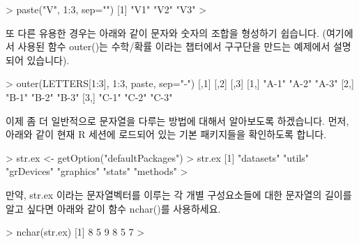 \begin{Schunk}
\begin{Soutput}
> paste("V", 1:3, sep="")
[1] "V1" "V2" "V3"
> 
\end{Soutput}
\end{Schunk}

또 다른 유용한 경우는 아래와 같이 문자와 숫자의 조합을 형성하기 쉽습니다. 
(여기에서 사용된 함수 outer()는 수학/확률 이라는 챕터에서 구구단을 만드는 예제에서 설명되어 있습니다).

\begin{Schunk}
\begin{Soutput}
> outer(LETTERS[1:3], 1:3, paste, sep="-")
     [,1]  [,2]  [,3] 
[1,] "A-1" "A-2" "A-3"
[2,] "B-1" "B-2" "B-3"
[3,] "C-1" "C-2" "C-3"
\end{Soutput}
\end{Schunk}

\begin{comment}
\begin{Schunk}
\begin{Soutput}
> lower.tri(outer(LETTERS[1:3], 1:3, paste, sep="-"))
      [,1]  [,2]  [,3]
[1,] FALSE FALSE FALSE
[2,]  TRUE FALSE FALSE
[3,]  TRUE  TRUE FALSE

> upper.tri(outer(LETTERS[1:3], 1:3, paste, sep="-"))
      [,1]  [,2]  [,3]
[1,] FALSE  TRUE  TRUE
[2,] FALSE FALSE  TRUE
[3,] FALSE FALSE FALSE
> 
\end{Soutput}
\end{Schunk}	
\end{comment}

이제 좀 더 일반적으로 문자열을 다루는 방법에 대해서 알아보도록 하겠습니다.
먼저, 아래와 같이 현재 R 세션에 로드되어 있는 기본 패키지들을 확인하도록 합니다.

\begin{Schunk}
\begin{Soutput}
> str.ex <- getOption("defaultPackages")
> str.ex
[1] "datasets"  "utils"     "grDevices" "graphics"  "stats"     "methods"  
>
\end{Soutput}
\end{Schunk}

만약, str.ex 이라는 문자열벡터를 이루는 각 개별 구성요소들에 대한 문자열의 길이를 알고 싶다면 아래와 같이 함수 nchar()를 사용하세요.

\begin{Schunk}
\begin{Soutput} 
> nchar(str.ex)
[1] 8 5 9 8 5 7
> 
\end{Soutput}
\end{Schunk}

